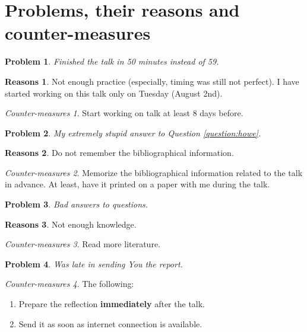 \documentclass[12pt]{article} %
\theoremstyle{theorem}
\newtheorem{problem}{Problem}
\theoremstyle{definition}
\newtheorem{reason}{Reasons}
\theoremstyle{remark}
\newtheorem{countermeasure}{Counter-measures}
\begin{document}
\section{Problems, their reasons and counter-measures}
\begin{problem}
	Finished the talk in 50 minutes instead of 59.
\end{problem}
\begin{reason}
	Not enough practice (especially, timing was still not perfect).
	I have started working on this talk only on Tuesday (August 2nd).
\end{reason}
\begin{countermeasure}
	Start working on talk at least 8 days before.
\end{countermeasure}

\begin{problem}
	My extremely stupid answer to Question \ref{question:howe}.
\end{problem}
\begin{reason}
	Do not remember the bibliographical information.
\end{reason}
\begin{countermeasure}
	Memorize the bibliographical information related to the talk in advance.
	At least, have it printed on a paper with me during the talk.
\end{countermeasure}

\begin{problem}
	Bad answers to questions.
\end{problem}
\begin{reason}
	Not enough knowledge.
\end{reason}
\begin{countermeasure}
	Read more literature.
\end{countermeasure}

\begin{problem}
	Was late in sending You the report.
\end{problem}
\begin{countermeasure}The following:
	\begin{enumerate}
		\item Prepare the reflection {\bf immediately} after the talk.
		\item Send it as soon as internet connection is available.
	\end{enumerate}
\end{countermeasure}

\end{document}
